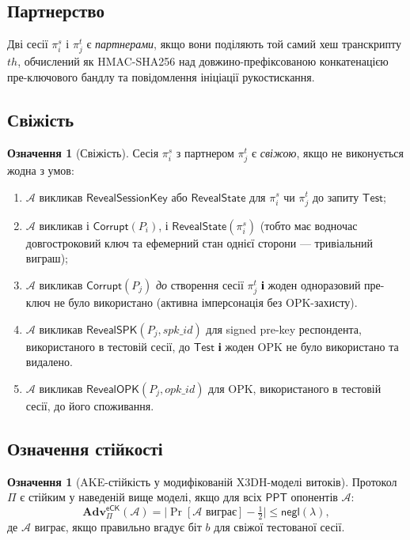 \documentclass[11pt,a4paper]{article}
\theoremstyle{definition}
\newtheorem{definition}[theorem]{Означення}
\newcommand{\secpar}{\ensuremath{\lambda}}
\newcommand{\negl}{\ensuremath{\mathsf{negl}}}
\newcommand{\ppt}{\ensuremath{\mathsf{PPT}}}
\newcommand{\adv}{\ensuremath{\mathbf{Adv}}}
\newcommand{\advA}{\ensuremath{\mathcal{A}}}
\newcommand{\eCK}{\textsf{eCK}}
\begin{document}
\subsection{Партнерство}\label{sec:partnering}

Дві сесії $\pi_i^s$ і $\pi_j^t$ є \emph{партнерами}, якщо вони
поділяють той самий хеш транскрипту $\mathit{th}$, обчислений як
HMAC-SHA256 над довжино-префіксованою конкатенацією пре-ключового
бандлу та повідомлення ініціації рукостискання.

\subsection{Свіжість}\label{sec:freshness}

\begin{definition}[Свіжість]\label{def:freshness}
Сесія $\pi_i^s$ з партнером $\pi_j^t$ є \emph{свіжою}, якщо не
виконується жодна з умов:
\begin{enumerate}
  \item $\advA$ викликав $\mathsf{RevealSessionKey}$ або
    $\mathsf{RevealState}$ для $\pi_i^s$ чи $\pi_j^t$ до запиту
    $\mathsf{Test}$;
  \item $\advA$ викликав і $\mathsf{Corrupt}(P_i)$, і
    $\mathsf{RevealState}(\pi_i^s)$ (тобто має водночас довгостроковий
    ключ та ефемерний стан однієї сторони — тривіальний виграш);
  \item $\advA$ викликав $\mathsf{Corrupt}(P_j)$ \emph{до} створення
    сесії $\pi_j^t$ \textbf{і} жоден одноразовий пре-ключ не було
    використано (активна імперсонація без OPK-захисту).
  \item $\advA$ викликав $\mathsf{RevealSPK}(P_j,\mathit{spk\_id})$ для
    signed pre-key респондента, використаного в тестовій сесії, до
    $\mathsf{Test}$ \textbf{і} жоден OPK не було використано та видалено.
  \item $\advA$ викликав $\mathsf{RevealOPK}(P_j,\mathit{opk\_id})$ для
    OPK, використаного в тестовій сесії, до його споживання.
\end{enumerate}
\end{definition}

\subsection{Означення стійкості}\label{sec:defs}

\begin{definition}[AKE-стійкість у модифікованій X3DH-моделі витоків]\label{def:ake}
Протокол $\Pi$ є стійким у наведеній вище моделі, якщо для всіх \ppt{} опонентів
$\advA$:
\begin{equation}\label{eq:eck-advantage}
  \adv^{\eCK}_{\Pi}(\advA) =
  \Big|\Pr[\advA \text{ виграє}] - \tfrac{1}{2}\Big|
  \le \negl(\secpar),
\end{equation}
де $\advA$ виграє, якщо правильно вгадує біт $b$ для свіжої
тестованої сесії.
\end{definition}
\end{document}
